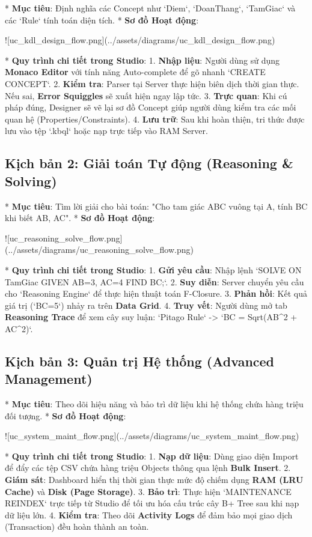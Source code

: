 *   \textbf{Mục tiêu}: Định nghĩa các Concept như `Diem`, `DoanThang`, `TamGiac` và các `Rule` tính toán diện tích.
*   \textbf{Sơ đồ Hoạt động}:

![uc\_kdl\_design\_flow.png](../assets/diagrams/uc\_kdl\_design\_flow.png)

*   \textbf{Quy trình chi tiết trong Studio}:
    1.  \textbf{Nhập liệu}: Người dùng sử dụng \textbf{Monaco Editor} với tính năng Auto-complete để gõ nhanh `CREATE CONCEPT`.
    2.  \textbf{Kiểm tra}: Parser tại Server thực hiện biên dịch thời gian thực. Nếu sai, \textbf{Error Squiggles} sẽ xuất hiện ngay lập tức.
    3.  \textbf{Trực quan}: Khi cú pháp đúng, Designer sẽ vẽ lại sơ đồ Concept giúp người dùng kiểm tra các mối quan hệ (Properties/Constraints).
    4.  \textbf{Lưu trữ}: Sau khi hoàn thiện, tri thức được lưu vào tệp `.kbql` hoặc nạp trực tiếp vào RAM Server.

\subsection{Kịch bản 2: Giải toán Tự động (Reasoning & Solving)}

*   \textbf{Mục tiêu}: Tìm lời giải cho bài toán: "Cho tam giác ABC vuông tại A, tính BC khi biết AB, AC".
*   \textbf{Sơ đồ Hoạt động}:

![uc\_reasoning\_solve\_flow.png](../assets/diagrams/uc\_reasoning\_solve\_flow.png)

*   \textbf{Quy trình chi tiết trong Studio}:
    1.  \textbf{Gửi yêu cầu}: Nhập lệnh `SOLVE ON TamGiac GIVEN AB=3, AC=4 FIND BC;`.
    2.  \textbf{Suy diễn}: Server chuyển yêu cầu cho `Reasoning Engine` để thực hiện thuật toán F-Closure.
    3.  \textbf{Phản hồi}: Kết quả giá trị (`BC=5`) nhảy ra trên \textbf{Data Grid}.
    4.  \textbf{Truy vết}: Người dùng mở tab \textbf{Reasoning Trace} để xem cây suy luận: `Pitago Rule` -> `BC = Sqrt(AB^2 + AC^2)`.

\subsection{Kịch bản 3: Quản trị Hệ thống (Advanced Management)}

*   \textbf{Mục tiêu}: Theo dõi hiệu năng và bảo trì dữ liệu khi hệ thống chứa hàng triệu đối tượng.
*   \textbf{Sơ đồ Hoạt động}:

![uc\_system\_maint\_flow.png](../assets/diagrams/uc\_system\_maint\_flow.png)

*   \textbf{Quy trình chi tiết trong Studio}:
    1.  \textbf{Nạp dữ liệu}: Dùng giao diện Import để đẩy các tệp CSV chứa hàng triệu Objects thông qua lệnh \textbf{Bulk Insert}.
    2.  \textbf{Giám sát}: Dashboard hiển thị thời gian thực mức độ chiếm dụng \textbf{RAM (LRU Cache)} và \textbf{Disk (Page Storage)}.
    3.  \textbf{Bảo trì}: Thực hiện `MAINTENANCE REINDEX` trực tiếp từ Studio để tối ưu hóa cấu trúc cây B+ Tree sau khi nạp dữ liệu lớn.
    4.  \textbf{Kiểm tra}: Theo dõi \textbf{Activity Logs} để đảm bảo mọi giao dịch (Transaction) đều hoàn thành an toàn.

